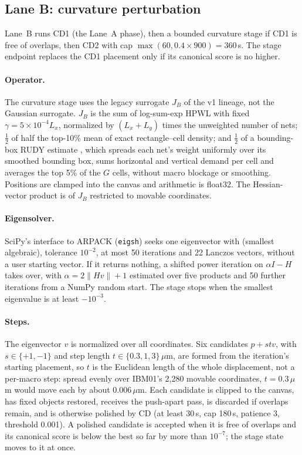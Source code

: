 \subsection{Lane B: curvature perturbation}\label{app:alg-laneb}

Lane~B runs CD1 (the Lane~A phase), then a bounded curvature stage if CD1 is free of
overlaps, then CD2 with cap $\max(60,0.4\times900)=360\,$s. The stage endpoint
replaces the CD1 placement only if its canonical score is no higher.

\paragraph{Operator.} The curvature stage uses the legacy surrogate $J_B$ of the v1
lineage, not the Gaussian surrogate. $J_B$ is the sum of log-sum-exp HPWL with fixed
$\gamma=5\times10^{-4}L_x$, normalized by $(L_x+L_y)$ times the unweighted number of nets;
$\tfrac12$ of half the top-10\% mean of exact rectangle--cell density; and $\tfrac12$
of a bounding-box RUDY estimate \citep{spindler2007rudy}, which spreads each net's
weight uniformly over its smoothed bounding box, sums horizontal and vertical demand
per cell and averages the top 5\% of the $G$ cells, without macro blockage or
smoothing. Positions are clamped into the canvas and arithmetic is float32. The
Hessian-vector product \citep{pearlmutter1994hvp} is
 of $J_B$ restricted to movable coordinates.

\paragraph{Eigensolver.} SciPy's interface to ARPACK \citep{lehoucq1998arpack}
(\texttt{eigsh}) seeks one
eigenvector with  (smallest algebraic), tolerance $10^{-2}$, at
most 50 iterations and 22 Lanczos vectors, without a user starting vector. If it
returns nothing, a shifted power iteration on $\alpha I-H$ takes over, with
$\alpha=2\lVert Hv\rVert+1$ estimated over five products and 50 further iterations
from a NumPy random start. The stage stops when the smallest eigenvalue is at
least $-10^{-3}$.

\paragraph{Steps.} The eigenvector $v$ is normalized over all coordinates. Six
candidates $p+stv$, with $s\in\{+1,-1\}$ and step length $t\in\{0.3,1,3\}\,\mu$m,
are formed from the iteration's starting placement, so $t$ is the Euclidean length
of the whole displacement, not a per-macro step: spread evenly over IBM01's 2,280
movable coordinates, $t=0.3\,\mu$m would move each by about $0.006\,\mu$m. Each candidate is clipped to
the canvas, has fixed objects restored, receives the push-apart pass, is discarded
if overlaps remain, and is otherwise polished by CD (at least 30\,s, cap 180\,s,
patience 3, threshold 0.001). A polished candidate is accepted when it is free of
overlaps and its canonical score is below the best so far by more than $10^{-7}$; the
stage state moves to it at once.

